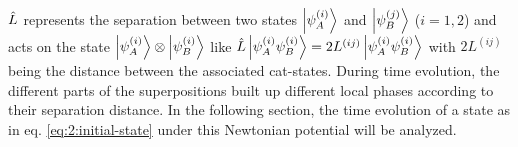 $\hat{L}$ represents the separation between two states $\ket{\psi^{(i)}_A}$ and $\ket{\psi^{(j)}_B}$ ($i=1,2$) and acts on the state $\ket{\psi^{(i)}_A} \otimes \ket{\psi^{(i)}_B}$ like $\hat{L} \ket{\psi^{(i)}_A \psi^{(i)}_B} = 2L^{(ij)}\ket{\psi^{(i)}_A \psi^{(i)}_B}$ with $2L^{(ij)}$ being the distance between the associated cat-states.
During time evolution, the different parts of the superpositions built up different local phases according to their separation distance.  In the following section, the time evolution of a state as in eq. \eqref{eq:2:initial-state} under this Newtonian potential will be analyzed.







